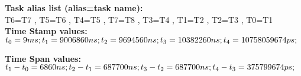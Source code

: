 \documentclass[landscape,a4paper,10pt]{article}
\begin{document}
\textbf{Task alias list (alias=task name):}\\
T6=T7 , 
T5=T6 , 
T4=T5 , 
T7=T8 , 
T3=T4 , 
T1=T2 , 
T2=T3 , 
T0=T1\\

\textbf{Time Stamp values:}\\
$t_{0} = 9 ms; t_{1} = 9006860 ns; t_{2} = 9694560 ns; t_{3} = 10382260 ns; t_{4} = 10758059674 ps;  \\
$

\textbf{Time Span values:}\\
$t_{1} - t_{0} = 6860 ns; t_{2} - t_{1} = 687700 ns; t_{3} - t_{2} = 687700 ns; t_{4} - t_{3} = 375799674 ps;  \\
$
\end{document}
